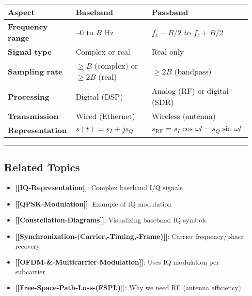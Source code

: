 {\def\LTcaptype{} %
\begin{longtable}[]{@{}
  >{\raggedright\arraybackslash}p{}
  >{\raggedright\arraybackslash}p{}
  >{\raggedright\arraybackslash}p{}@{}}
\toprule\noalign{}
\begin{minipage}[b]{\linewidth}\raggedright
Aspect
\end{minipage} & \begin{minipage}[b]{\linewidth}\raggedright
Baseband
\end{minipage} & \begin{minipage}[b]{\linewidth}\raggedright
Passband
\end{minipage} \\
\midrule\noalign{}
\endhead
\bottomrule\noalign{}
\endlastfoot
\textbf{Frequency range} & \textasciitilde0 to \(B\) Hz & \(f_c - B/2\)
to \(f_c + B/2\) \\
\textbf{Signal type} & Complex or real & Real only \\
\textbf{Sampling rate} & \(\geq B\) (complex) or \(\geq 2B\) (real) &
\(\geq 2B\) (bandpass) \\
\textbf{Processing} & Digital (DSP) & Analog (RF) or digital (SDR) \\
\textbf{Transmission} & Wired (Ethernet) & Wireless (antenna) \\
\textbf{Representation} & \(s(t) = s_I + js_Q\) &
\(s_{\text{RF}} = s_I\cos\omega t - s_Q\sin\omega t\) \\
\end{longtable}
}

\begin{center}\rule{0.5\linewidth}{0.5pt}\end{center}

\subsection{Related Topics}\label{related-topics}

\begin{itemize}
\tightlist
\item
  \textbf{{[}{[}IQ-Representation{]}{]}}: Complex baseband I/Q signals
\item
  \textbf{{[}{[}QPSK-Modulation{]}{]}}: Example of IQ modulation
\item
  \textbf{{[}{[}Constellation-Diagrams{]}{]}}: Visualizing baseband IQ
  symbols
\item
  \textbf{{[}{[}Synchronization-(Carrier,-Timing,-Frame){]}{]}}: Carrier
  frequency/phase recovery
\item
  \textbf{{[}{[}OFDM-\&-Multicarrier-Modulation{]}{]}}: Uses IQ
  modulation per subcarrier
\item
  \textbf{{[}{[}Free-Space-Path-Loss-(FSPL){]}{]}}: Why we need RF
  (antenna efficiency)
\end{itemize}


